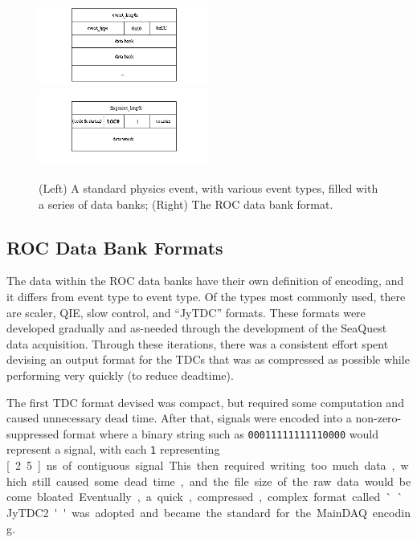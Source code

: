 \begin{figure}
	\centerline{
		\mbox{\includegraphics[width=0.5\textwidth]{figures/production/physics_event.png} \includegraphics[width=0.5\textwidth]{figures/production/roc_event.png}}
	}
	\caption{(Left) A standard physics event, with various event types, filled with a series of data banks; (Right) The ROC data bank format\cite{jlab:coda}.}
	\label{fig:coda-physics-roc}
\end{figure}

\subsection{ROC Data Bank Formats}

The data within the ROC data banks have their own definition of encoding, and it differs from event type to event type. Of the types most commonly used, there are scaler, QIE, slow control, and ``JyTDC'' formats. These formats were developed gradually and as-needed through the development of the SeaQuest data acquisition. Through these iterations, there was a consistent effort spent devising an output format for the TDCs that was as compressed as possible while performing very quickly (to reduce deadtime). 

The first TDC format devised was compact, but required some computation and caused unnecessary dead time. After that, signals were encoded into a non-zero-suppressed format where a binary string such as \verb|00011111111110000| would represent a signal, with each \verb|1| representing \unit[2.5]{ns} of contiguous signal. This then required writing too much data, which still caused some dead time, and the file size of the raw data would become bloated. Eventually, a quick, compressed, complex format called ``JyTDC2'' was adopted and became the standard for the MainDAQ encoding.

